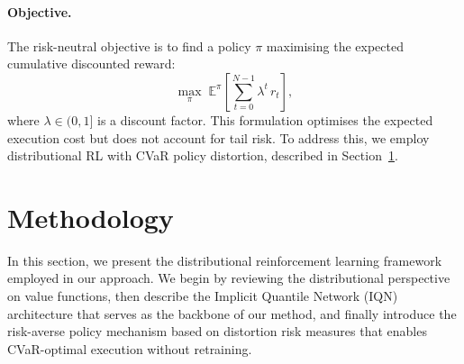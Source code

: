 \documentclass[11pt]{article}
\begin{document}
\paragraph{Objective.}
The risk-neutral objective is to find a policy $\pi$ maximising the expected cumulative discounted reward:
\begin{equation}\label{eq:objective}
    \max_\pi \; \mathbb{E}^{\pi} \!\left[ \sum_{t=0}^{N-1} \lambda^t \, r_t \right],
\end{equation}
where $\lambda \in (0,1]$ is a discount factor. This formulation optimises the expected execution cost but does not account for tail risk. To address this, we employ distributional RL with CVaR policy distortion, described in Section~\ref{sec:methodology}.


%

\section{Methodology}\label{sec:methodology}

In this section, we present the distributional reinforcement learning framework employed in our approach. We begin by reviewing the distributional perspective on value functions, then describe the Implicit Quantile Network (IQN) architecture that serves as the backbone of our method, and finally introduce the risk-averse policy mechanism based on distortion risk measures that enables CVaR-optimal execution without retraining.
\end{document}
